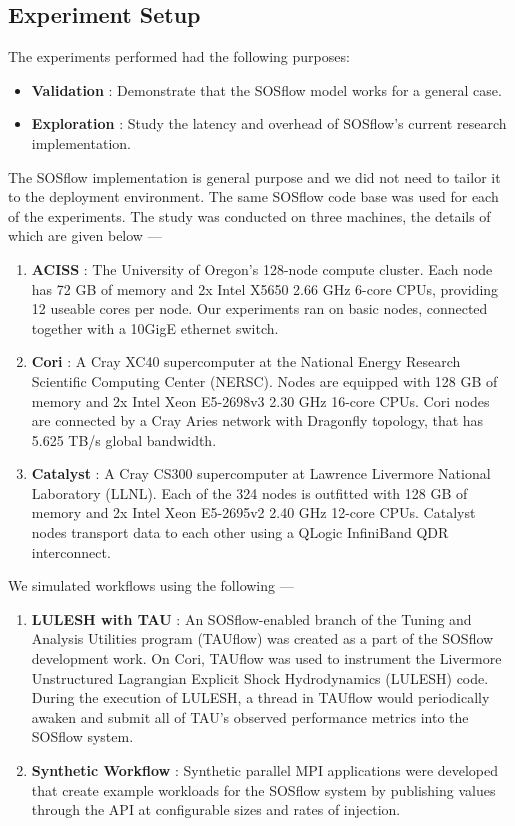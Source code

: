 \subsection{Experiment Setup} %
%
The experiments performed had the following purposes:
%
\begin{itemize}
\item \textbf{Validation} : Demonstrate that the SOSflow model works
  for a general case.
%
\item \textbf{Exploration} : Study the latency and overhead of
  SOSflow's current research implementation.
%
\end {itemize}
%
The SOSflow implementation is general purpose and we did not need to
tailor it to the deployment environment.
%
The same SOSflow code base was used for each of the experiments.
%
The study was conducted on three machines, the details of which are
given below ---
%
\begin{enumerate}
%
\item \textbf{ACISS} : The University of Oregon's 128-node compute
  cluster.
%
Each node has 72 GB of memory and 2x Intel X5650 2.66 GHz 6-core CPUs,
providing 12 useable cores per node.
%
Our experiments ran on basic nodes, connected together with a 10GigE
ethernet switch.
%
%
\item \textbf{Cori} : A Cray XC40 supercomputer at the National Energy Research Scientific
  Computing Center (NERSC).
%
Nodes are equipped with 128 GB of memory and 2x Intel Xeon
E5-2698v3 2.30 GHz 16-core CPUs.
%
Cori nodes are connected by a Cray Aries network with Dragonfly
topology, that has 5.625 TB/s global bandwidth.
%
%
\item \textbf{Catalyst} : A Cray CS300 supercomputer at Lawrence
  Livermore National Laboratory (LLNL).
%
Each of the 324 nodes is outfitted with 128 GB of memory and 2x Intel
Xeon E5-2695v2 2.40 GHz 12-core CPUs.
%
Catalyst nodes transport data to each other using a QLogic InfiniBand
QDR interconnect.
%
\end{enumerate}
%
%
We simulated workflows using the following --- 
%
\begin{enumerate}
%
\item \textbf{LULESH with TAU} : An SOSflow-enabled branch of the
  Tuning and Analysis Utilities program (TAUflow) was created as a
  part of the SOSflow development work.
%
On Cori, TAUflow was used to instrument the Livermore Unstructured
Lagrangian Explicit Shock Hydrodynamics (LULESH) code.
%
During the execution of LULESH, a thread in TAUflow would periodically
awaken and submit all of TAU's observed performance metrics into the
SOSflow system.
%
\item \textbf{Synthetic Workflow} : Synthetic parallel MPI
  applications were developed that create example workloads for the
  SOSflow system by publishing values through the API at configurable
  sizes and rates of injection.
%
\end{enumerate}
%
%


